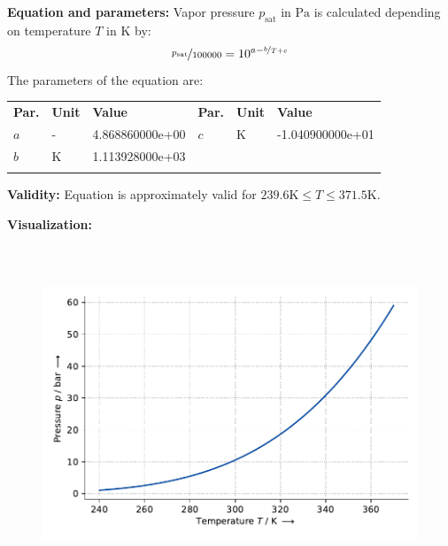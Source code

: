 \textbf{Equation and parameters:}
\newline
%
Vapor pressure $p_\mathrm{sat}$ in $\si{\pascal}$ is calculated depending on temperature $T$ in $\si{\kelvin}$ by:
%
\begin{equation*}
\nicefrac{p_\mathrm{sat}}{100000} = 10^{a - \nicefrac{b}{T + c}}
\end{equation*}
%
The parameters of the equation are:
%
\begin{longtable}[l]{lll|lll}
\toprule
\addlinespace
\textbf{Par.} & \textbf{Unit} & \textbf{Value} &	\textbf{Par.} & \textbf{Unit} & \textbf{Value} \\
\addlinespace
\midrule
\endhead

\bottomrule
\endfoot
\bottomrule
\endlastfoot
\addlinespace

$a$ & - & 4.868860000e+00 & $c$ & $\si{\kelvin}$  & -1.040900000e+01 \\
$b$ & $\si{\kelvin}$ & 1.113928000e+03 & & & \\

\addlinespace\end{longtable}

\textbf{Validity:}
\newline
Equation is approximately valid for $239.6 \si{\kelvin} \leq T \leq 371.5 \si{\kelvin}$.
\newline

\textbf{Visualization:}
%
\begin{figure}[!htp]
{\noindent\includegraphics[height=10cm, keepaspectratio]{figs/ref/ref_Ammonia_VaporPressure_Antoine_1.pdf}}
\end{figure}
%

